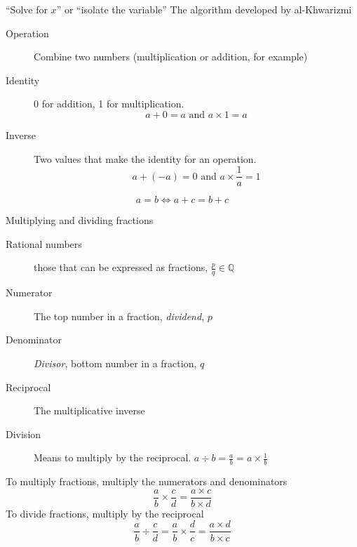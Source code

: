 \begin{frame}{``Solve for $x$'' or ``isolate the variable''}
  {The algorithm developed by al-Khwarizmi}
  \begin{description}
    \item[Operation] Combine two numbers (multiplication or addition, for example)
    \item[Identity] 0 for addition, 1 for multiplication. 
      $$a+0=a \text{ and } a \times 1 = a$$
    \item[Inverse] Two values that make the identity for an operation. 
      $$a + (-a)=0 \text{ and } a \times \frac{1}{a}=1$$
  \end{description}
  $$a = b \Longleftrightarrow a+c = b+c$$
\end{frame}

\begin{frame}{Multiplying and dividing fractions}
  \begin{description}
    \item[Rational numbers] those that can be expressed as fractions, $\displaystyle \frac{p}{q} \in \mathbb{Q}$
    \item[Numerator] The top number in a fraction, \emph{dividend}, $p$
    \item[Denominator] \emph{Divisor}, bottom number in a fraction, $q$
    \item[Reciprocal] The multiplicative inverse
    \item[Division] Means to multiply by the reciprocal. $a \div b = \frac{a}{b} = a \times \frac{1}{b}$
  \end{description}
  To multiply fractions, multiply the numerators and denominators
  $$\frac{a}{b} \times \frac{c}{d} =\frac{a \times c}{b\times d}  $$
  To divide fractions, multiply by the reciprocal
  $$\frac{a}{b} \div \frac{c}{d} = \frac{a}{b} \times \frac{d}{c} = \frac{a \times d}{b\times c}  $$
  \end{frame}

